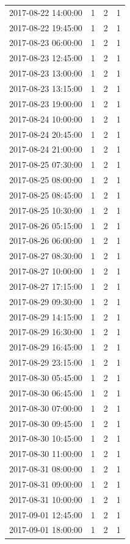 \begin{tabular}{lrrr}
2017-08-22 14:00:00 & 1 & 2 & 1 \\
2017-08-22 19:45:00 & 1 & 2 & 1 \\
2017-08-23 06:00:00 & 1 & 2 & 1 \\
2017-08-23 12:45:00 & 1 & 2 & 1 \\
2017-08-23 13:00:00 & 1 & 2 & 1 \\
2017-08-23 13:15:00 & 1 & 2 & 1 \\
2017-08-23 19:00:00 & 1 & 2 & 1 \\
2017-08-24 10:00:00 & 1 & 2 & 1 \\
2017-08-24 20:45:00 & 1 & 2 & 1 \\
2017-08-24 21:00:00 & 1 & 2 & 1 \\
2017-08-25 07:30:00 & 1 & 2 & 1 \\
2017-08-25 08:00:00 & 1 & 2 & 1 \\
2017-08-25 08:45:00 & 1 & 2 & 1 \\
2017-08-25 10:30:00 & 1 & 2 & 1 \\
2017-08-26 05:15:00 & 1 & 2 & 1 \\
2017-08-26 06:00:00 & 1 & 2 & 1 \\
2017-08-27 08:30:00 & 1 & 2 & 1 \\
2017-08-27 10:00:00 & 1 & 2 & 1 \\
2017-08-27 17:15:00 & 1 & 2 & 1 \\
2017-08-29 09:30:00 & 1 & 2 & 1 \\
2017-08-29 14:15:00 & 1 & 2 & 1 \\
2017-08-29 16:30:00 & 1 & 2 & 1 \\
2017-08-29 16:45:00 & 1 & 2 & 1 \\
2017-08-29 23:15:00 & 1 & 2 & 1 \\
2017-08-30 05:45:00 & 1 & 2 & 1 \\
2017-08-30 06:45:00 & 1 & 2 & 1 \\
2017-08-30 07:00:00 & 1 & 2 & 1 \\
2017-08-30 09:45:00 & 1 & 2 & 1 \\
2017-08-30 10:45:00 & 1 & 2 & 1 \\
2017-08-30 11:00:00 & 1 & 2 & 1 \\
2017-08-31 08:00:00 & 1 & 2 & 1 \\
2017-08-31 09:00:00 & 1 & 2 & 1 \\
2017-08-31 10:00:00 & 1 & 2 & 1 \\
2017-09-01 12:45:00 & 1 & 2 & 1 \\
2017-09-01 18:00:00 & 1 & 2 & 1 \\

\end{tabular}

